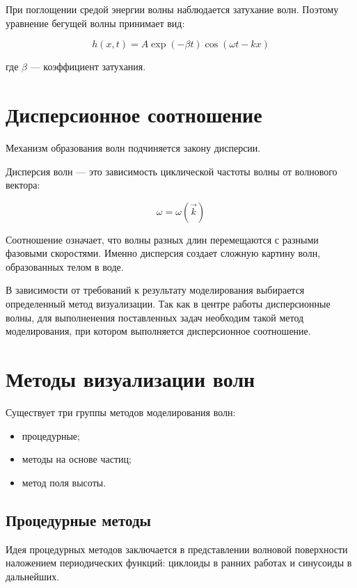 При поглощении средой энергии волны наблюдается затухание волн. Поэтому уравнение бегущей волны принимает вид:

\begin{equation}
    \label{solution-wave-eq3}
    h(x,t) = A \exp(-\beta t) \cos (\omega t - kx)
\end{equation}

где $\beta$ --- коэффициент затухания.

\section{Дисперсионное соотношение}

Механизм образования волн подчиняется закону дисперсии.

Дисперсия волн --- это зависимость циклической частоты волны от волнового вектора:

\begin{equation}
    \label{dispersion}
    \omega = \omega (\vec{k})
\end{equation}

Соотношение означает, что волны разных длин перемещаются с разными фазовыми скоростями. Именно дисперсия создает сложную картину волн, образованных телом в воде.

В зависимости от требований к результату моделирования выбирается определенный метод визуализации. Так как в центре работы дисперсионные волны, для выполненения поставленных задач необходим такой метод моделирования, при котором выполняется дисперсионное соотношение.

\section{Методы визуализации волн}

Существует три группы методов моделирования волн:

\begin{itemize}
    \item процедурные;
    \item методы на основе частиц;
    \item метод поля высоты.
\end{itemize}

\subsection{Процедурные методы}

Идея процедурных методов заключается в представлении волновой поверхности наложением периодических функций: циклоиды в ранних работах и синусоиды в дальнейших. 


